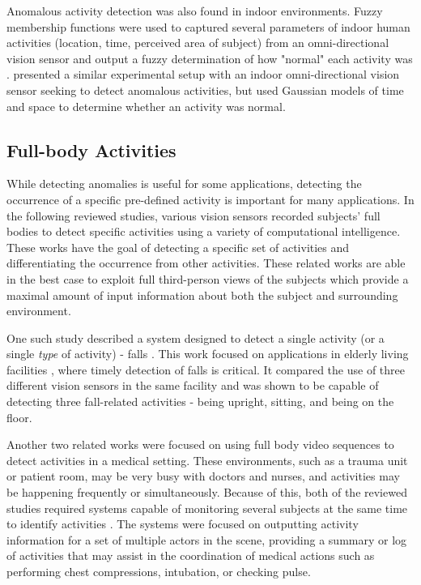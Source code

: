 \documentclass[12pt]{report}
\begin{document}
Anomalous activity detection was also found in indoor environments. Fuzzy membership functions were used to captured several parameters of indoor human activities (location, time, perceived area of subject) from an omni-directional vision sensor and output a fuzzy determination of how "normal" each activity was \cite{Seki2009}. \cite{Yiping2006} presented a similar experimental setup with an indoor omni-directional vision sensor seeking to detect anomalous activities, but used Gaussian models of time and space to determine whether an activity was normal.

\subsection{Full-body Activities}

While detecting anomalies is useful for some applications, detecting the occurrence of a specific pre-defined activity is important for many applications. In the following reviewed studies, various vision sensors recorded subjects’ full bodies to detect specific activities using a variety of computational intelligence. These works have the goal of detecting a specific set of activities and differentiating the occurrence from other activities. These related works are able in the best case to exploit full third-person views of the subjects which provide a maximal amount of input information about both the subject and surrounding environment.

One such study described a system designed to detect a single activity (or a single \textit{type} of activity) - falls \cite{Banerjee2014}. This work focused on applications in elderly living facilities , where timely detection of falls is critical.  It compared the use of three different vision sensors in the same facility and was shown to be capable of detecting three fall-related activities - being upright, sitting, and being on the floor.

Another two related works were focused on using full body video sequences to detect activities in a medical setting. These environments, such as a trauma unit or patient room, may be very busy with doctors and nurses, and activities may be happening frequently or simultaneously. Because of this, both of the reviewed studies required systems capable of monitoring several subjects at the same time to identify activities \cite{Chakraborty2013, Bloisi2009}. The systems were focused on outputting activity information for a set of multiple actors in the scene, providing a summary or log of activities that may assist in the coordination of medical actions such as performing chest compressions, intubation, or checking pulse.
\end{document}
